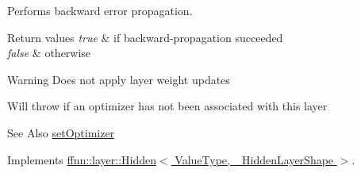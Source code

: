 Performs backward error propagation. 


\begin{DoxyRetVals}{Return values}
{\em true} & if backward-\/propagation succeeded \\
\hline
{\em false} & otherwise \\
\hline
\end{DoxyRetVals}
\begin{DoxyWarning}{Warning}
Does not apply layer weight updates 

Will throw if an optimizer has not been associated with this layer 
\end{DoxyWarning}
\begin{DoxySeeAlso}{See Also}
\hyperlink{classffnn_1_1layer_1_1_fully_connected_ae57e6eedc1808825635a1c04aa018992}{set\-Optimizer} 
\end{DoxySeeAlso}


Implements \hyperlink{classffnn_1_1layer_1_1_hidden_aac0ee89390b02ff4731678883dd402dd}{ffnn\-::layer\-::\-Hidden$<$ Value\-Type, \-\_\-\-Hidden\-Layer\-Shape $>$}.

